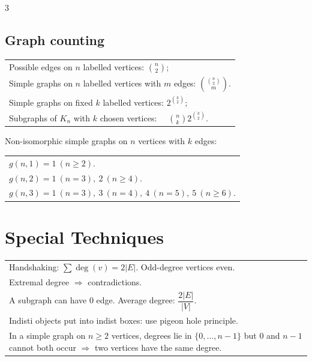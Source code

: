 \documentclass[10pt]{article}
\begin{document}
\begin{multicols*}{3}
\subsection*{Graph counting}
\vspace{-1pt}
\begin{tabular}{@{}p{}@{}}
Possible edges on $n$ labelled vertices: $\binom{n}{2}$; \\
\vspace{-10pt}
Simple graphs on $n$ labelled vertices with $m$ edges:
$\binom{\binom{n}{2}}{m}$.\\
\vspace{-10pt}
Simple graphs on fixed $k$ labelled vertices: $2^{\binom{k}{2}}$; \\
\vspace{-10pt}
Subgraphs of $K_n$ with $k$ chosen vertices: $\quad \binom{n}{k}2^{\binom{k}{2}}$.\\
\end{tabular}

Non-isomorphic simple graphs on $n$ vertices with $k$ edges:
\begin{tabular}{@{}p{}@{}}
$g(n,1)=1\ (n\ge2)$. \\
$g(n,2)=1\ (n=3),\ 2\ (n\ge4)$. \\
$g(n,3)=1\ (n=3),\ 3\ (n=4),\ 4\ (n=5),\ 5\ (n\ge6)$.
\end{tabular}
\section*{\small Special Techniques}
\vspace{-2pt}
\begin{tabular}{@{}p{}@{}}
Handshaking: $\sum\deg(v)=2|E|$. \quad
Odd-degree vertices even.\\
Extremal degree $\Rightarrow$ contradictions.\\
\vspace{-8pt}
A subgraph can have 0 edge. Average degree: $\dfrac{2|E|}{|V|}$.\\
\vspace{-10pt}
Indisti objects put into indist boxes: use pigeon hole principle.\\
In a simple graph on $n\!\ge\!2$ vertices, degrees lie in $\{0,\dots,n\!-\!1\}$ but $0$ and $n\!-\!1$ cannot both occur $\Rightarrow$ two vertices have the same degree.\\
\end{tabular}

\end{multicols*}
\end{document}
